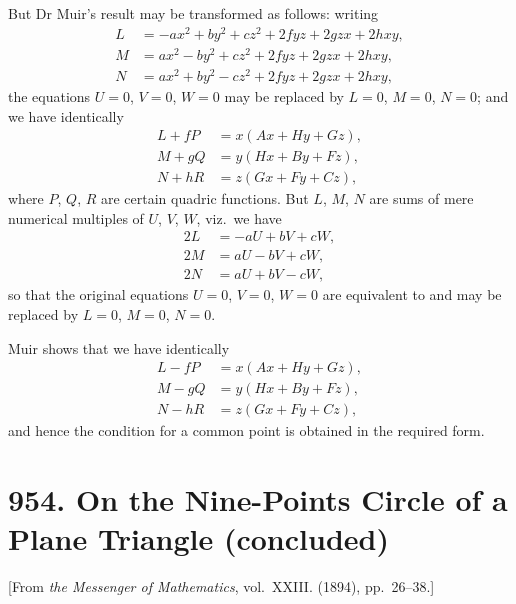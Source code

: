 \documentclass[11pt,a4paper]{book}
\begin{document}
But Dr Muir's result may be transformed as follows: writing
\begin{align*}
L &= -ax^2 + by^2 + cz^2 + 2fyz + 2gzx + 2hxy, \\
M &= ax^2 - by^2 + cz^2 + 2fyz + 2gzx + 2hxy, \\
N &= ax^2 + by^2 - cz^2 + 2fyz + 2gzx + 2hxy,
\end{align*}
the equations $U = 0$, $V = 0$, $W = 0$ may be replaced by $L = 0$, $M = 0$, $N = 0$; and we have identically
\begin{align*}
L + fP &= x(Ax + Hy + Gz), \\
M + gQ &= y(Hx + By + Fz), \\
N + hR &= z(Gx + Fy + Cz),
\end{align*}
where $P$, $Q$, $R$ are certain quadric functions. But $L$, $M$, $N$ are sums of mere numerical multiples of $U$, $V$, $W$, viz.~we have
\begin{align*}
2L &= -aU + bV + cW, \\
2M &= aU - bV + cW, \\
2N &= aU + bV - cW,
\end{align*}
so that the original equations $U = 0$, $V = 0$, $W = 0$ are equivalent to and may be replaced by $L = 0$, $M = 0$, $N = 0$.

Muir shows that we have identically
\begin{align*}
L - fP &= x(Ax + Hy + Gz), \\
M - gQ &= y(Hx + By + Fz), \\
N - hR &= z(Gx + Fy + Cz),
\end{align*}
and hence the condition for a common point is obtained in the required form.

\newpage
\clearpage


\thispagestyle{fancy}


\newpage

\section{954. On the Nine-Points Circle of a Plane Triangle (concluded)}
\label{sec:954}

[From \textit{the Messenger of Mathematics}, vol.~XXIII. (1894), pp.~26--38.]
\bigskip
\end{document}

